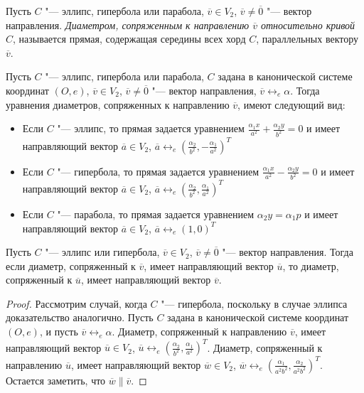 \begin{definition}
	Пусть $C$ "--- эллипс, гипербола или парабола, $\overline{v} \in V_2$, $\overline{v} \ne \overline 0$ "--- вектор направления. \textit{Диаметром, сопряженным к направлению $\overline{v}$ относительно кривой $C$}, называется прямая, содержащая середины всех хорд $C$, параллельных вектору $\overline{v}$.
\end{definition}

\begin{note}
	Пусть $C$ "--- эллипс, гипербола или парабола, $C$ задана в канонической системе координат $(O, e)$, $\overline{v} \in V_2$, $\overline{v} \ne \overline 0$ "--- вектор направления, $\overline{v} \leftrightarrow_{e} \alpha$. Тогда уравнения диаметров, сопряженных к направлению $\overline{v}$, имеют следующий вид:
	\begin{itemize}
		\item Если $C$ "--- эллипс, то прямая задается уравнением $\frac{\alpha_1 x}{a^2} + \frac{\alpha_2 y}{b^2} = 0$ и имеет направляющий вектор $\overline a \in V_2$, $\overline{a} \leftrightarrow_{e} (\frac{\alpha_2}{b^2}, -\frac{\alpha_1}{a^2})^T$
		\item Если $C$ "--- гипербола, то прямая задается уравнением $\frac{\alpha_1 x}{a^2} - \frac{\alpha_2 y}{b^2} = 0$ и имеет направляющий вектор $\overline a \in V_2$, $\overline{a} \leftrightarrow_{e} (\frac{\alpha_2}{b^2}, \frac{\alpha_1}{a^2})^T$
		\item Если $C$ "--- парабола, то прямая задается уравнением $\alpha_2 y = \alpha_1 p$ и имеет направляющий вектор $\overline a \in V_2$, $\overline{a} \leftrightarrow_{e} (1, 0)^T$
	\end{itemize}
\end{note}

\begin{proposition}
	Пусть $C$ "--- эллипс или гипербола, $\overline{v} \in V_2$, $\overline{v} \ne \overline 0$ "--- вектор направления. Тогда если диаметр, сопряженный к $\overline{v}$, имеет направляющий вектор $\overline{u}$, то диаметр, сопряженный к $\overline{u}$, имеет направляющий вектор $\overline{v}$.
\end{proposition}

\begin{proof}
	Рассмотрим случай, когда $C$ "--- гипербола, поскольку в случае эллипса доказательство аналогично. Пусть $C$ задана в канонической системе координат $(O, e)$, и пусть $\overline{v} \leftrightarrow_{e} \alpha$. Диаметр, сопряженный к направлению $\overline{v}$, имеет направляющий вектор $\overline{u} \in V_2$, $\overline u \leftrightarrow_{e} (\frac{\alpha_2}{b^2}, \frac{\alpha_1}{a^2})^T$. Диаметр, сопряженный к направлению $\overline{u}$, имеет направляющий вектор $\overline w \in V_2$, $\overline{w} \leftrightarrow_{e} (\frac{\alpha_1}{a^2b^2}, \frac{\alpha_2}{a^2b^2})^T$. Остается заметить, что $\overline{w} \parallel \overline{v}$.
\end{proof}

